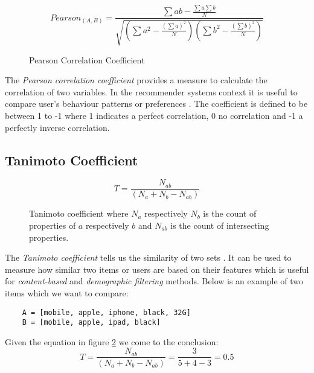 \begin{figure}[ht]
    \[Pearson_(A,B) = \frac{\sum ab - \frac{\sum a \sum b}{N}}{\sqrt{(\sum a^{2} - \frac{(\sum a)^{2}}{N})(\sum b^{2} - \frac{(\sum b)^{2}}{N})}}\]
    \caption{Pearson Correlation Coefficient}
    \label{fig:pearson}
\end{figure}

The \textit{Pearson correlation coefficient} provides a measure to calculate the correlation of two variables. In the recommender systems context it is useful to compare user's behaviour patterns or preferences \cite{segaran07}. The coefficient is defined to be between 1 to -1 where 1 indicates a perfect correlation, 0 no correlation and -1 a perfectly inverse correlation.

\subsection{Tanimoto Coefficient}

\begin{figure}[ht]
    \[T = \frac{N_{ab}}{(N_a + N_b - N_{ab})}\]
    \caption[Tanimoto coefficient]{Tanimoto coefficient where \(N_a\) respectively \(N_b\) is the count of properties of \(a\) respectively \(b\) and \(N_{ab}\) is the count of intersecting properties.}
    \label{fig:tanimoto}
\end{figure}

The \textit{Tanimoto coefficient} tells us the similarity of two sets \cite{segaran07}. It can be used to measure how similar two items or users are based on their features which is useful for \textit{content-based} and \textit{demographic filtering} methods. Below is an example of two items which we want to compare:

\lstset{language=Python}
\begin{lstlisting}
    A = [mobile, apple, iphone, black, 32G]
    B = [mobile, apple, ipad, black]
\end{lstlisting}

Given the equation in figure \ref{fig:tanimoto} we come to the conclusion: \[T = \frac{N_{ab}}{(N_a + N_b - N_{ab})} = \frac{3}{5 + 4 - 3} = 0.5\]